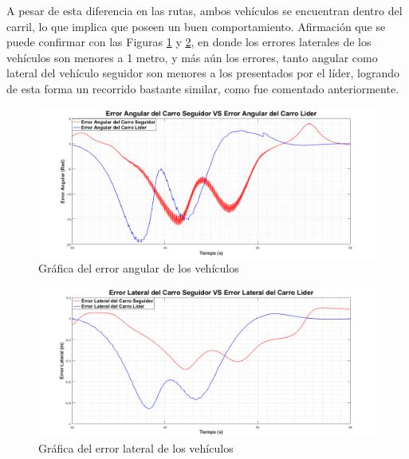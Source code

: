 \par A pesar de esta diferencia en las rutas, ambos vehículos se encuentran dentro del carril, lo que implica que poseen un buen comportamiento. Afirmación que se puede confirmar con las Figuras \ref{fig:csea} y \ref{fig:csel}, en donde los errores laterales de los vehículos son menores a 1 metro, y más aún los errores, tanto angular como lateral del vehículo seguidor son menores a los presentados por el líder, logrando de esta forma un recorrido bastante similar, como fue comentado anteriormente.

\begin{figure}[H]
	\centering
		\includegraphics[scale=0.35]{Imagenes/csea}
		\caption{Gráfica del error angular de los vehículos}
		\label{fig:csea}
\end{figure}	

\begin{figure}[H]
	\centering
		\includegraphics[scale=0.35]{Imagenes/csel}
		\caption{Gráfica del error lateral de los vehículos}
		\label{fig:csel}
\end{figure}	



